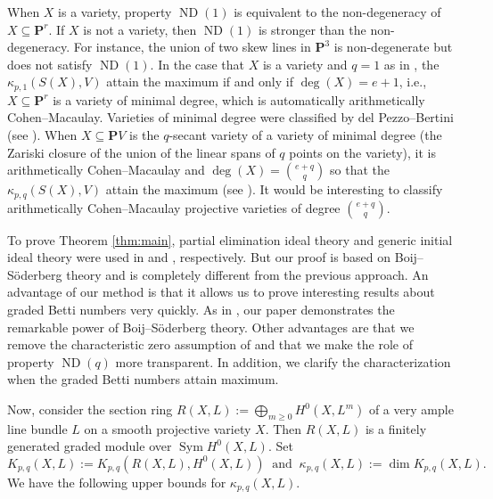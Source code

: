 \documentclass[12pt]{amsart}
\theoremstyle{definition}
\theoremstyle{remark}
\theoremstyle{corollary}
\theoremstyle{theorem}
\theoremstyle{corollary}
\theoremstyle{corollary}
\theoremstyle{definition}
\theoremstyle{remark}
\numberwithin{equation}{section}
\def\nP{\mathbf{P}}
\def\Sym{\operatorname{Sym}}
\DeclareMathOperator{\ND}{ND}
\begin{document}
\medskip

When $X$ is a variety, property $\ND(1)$ is equivalent to  the non-degeneracy of $X \subseteq \nP^r$. If $X$ is not a variety, then $\ND(1)$ is stronger than the non-degeneracy. For instance, the union of two skew lines in $\nP^3$ is non-degenerate but does not satisfy $\ND(1)$. In the case that $X$ is a variety and $q=1$ as in \cite{HK}, the $\kappa_{p,1}(S(X), V)$ attain the maximum if and only if $\deg(X)=e+1$, i.e., $X \subseteq \nP^r$ is a variety of minimal degree, which is automatically arithmetically Cohen--Macaulay. Varieties of minimal degree were classified by del Pezzo--Bertini (see \cite{EH}). When $X \subseteq \nP V$ is the $q$-secant variety of a variety of minimal degree (the Zariski closure of the union of the linear spans of $q$ points on the variety), it is arithmetically Cohen--Macaulay and $\deg(X) = {e+q \choose q}$ so that the $\kappa_{p,q}(S(X), V)$ attain the maximum (see \cite{CK}). It would be interesting to classify arithmetically Cohen--Macaulay projective varieties of degree ${e+ q \choose q}$. 

\medskip

To prove Theorem \ref{thm:main}, partial elimination ideal theory and generic initial ideal theory were used in \cite{HK} and \cite{AHK}, respectively. But our proof is based on Boij--S\"{o}derberg theory \cite{BS, ES} and is completely different from the previous approach. An advantage of our method is that it allows us to prove interesting results about graded Betti numbers very quickly. As in \cite{Erman}, our paper demonstrates the remarkable power of Boij--S\"{o}derberg theory. Other advantages are that we remove the characteristic zero assumption of \cite{AHK} and that we make the role of property $\ND(q)$ more transparent. In addition, we clarify the characterization when the graded Betti numbers attain maximum.

\medskip

Now, consider the section ring $R(X, L):=\bigoplus_{m \geq 0} H^0(X, L^m)$ of a very ample line bundle $L$ on a smooth projective variety $X$. Then $R(X,L)$ is a finitely generated graded module over $\Sym H^0(X, L)$. Set 
$$
K_{p,q}(X, L):=K_{p,q}(R(X,L), H^0(X, L))~\text{ and }~\kappa_{p,q}(X, L):=\dim K_{p,q}(X, L).
$$
We have the following upper bounds for $\kappa_{p,q}(X, L)$. 
\end{document}
